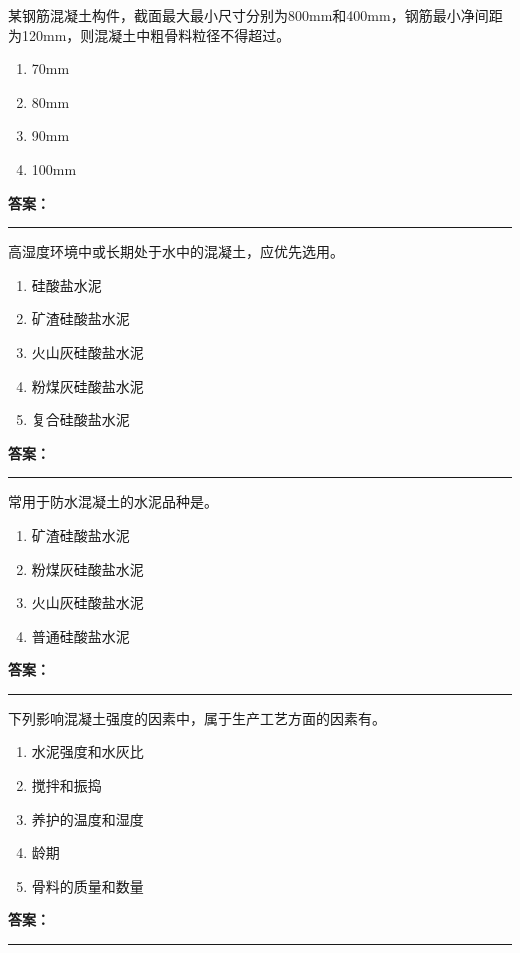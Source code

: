 \documentclass[UTF8,fontset=fandol,11pt]{ctexart}
\newcommand{\answerline}{\textcolor{answerred}{\rule{2.4cm}{0.7pt}}}
\begin{document}
\vspace{0.2em}

\begin{quizbox}[title={第 59 题}]
某钢筋混凝土构件，截面最大最小尺寸分别为800mm和400mm，钢筋最小净间距为120mm，则混凝土中粗骨料粒径不得超过。\\
\begin{enumerate}[label=\Alph*.]
\item 70mm
\item 80mm
\item 90mm
\item 100mm
\end{enumerate}
\textbf{\textcolor{answerred}{答案：}} \answerline
\end{quizbox}

\vspace{0.2em}

\begin{quizbox}[title={第 60 题}]
高湿度环境中或长期处于水中的混凝土，应优先选用。\\
\begin{enumerate}[label=\Alph*.]
\item 硅酸盐水泥
\item 矿渣硅酸盐水泥
\item 火山灰硅酸盐水泥
\item 粉煤灰硅酸盐水泥
\item 复合硅酸盐水泥
\end{enumerate}
\textbf{\textcolor{answerred}{答案：}} \answerline
\end{quizbox}

\vspace{0.2em}

\begin{quizbox}[title={第 61 题}]
常用于防水混凝土的水泥品种是。\\
\begin{enumerate}[label=\Alph*.]
\item 矿渣硅酸盐水泥
\item 粉煤灰硅酸盐水泥
\item 火山灰硅酸盐水泥
\item 普通硅酸盐水泥
\end{enumerate}
\textbf{\textcolor{answerred}{答案：}} \answerline
\end{quizbox}

\vspace{0.2em}

\begin{quizbox}[title={第 62 题}]
下列影响混凝土强度的因素中，属于生产工艺方面的因素有。\\
\begin{enumerate}[label=\Alph*.]
\item 水泥强度和水灰比
\item 搅拌和振捣
\item 养护的温度和湿度
\item 龄期
\item 骨料的质量和数量
\end{enumerate}
\textbf{\textcolor{answerred}{答案：}} \answerline
\end{quizbox}
\end{document}
